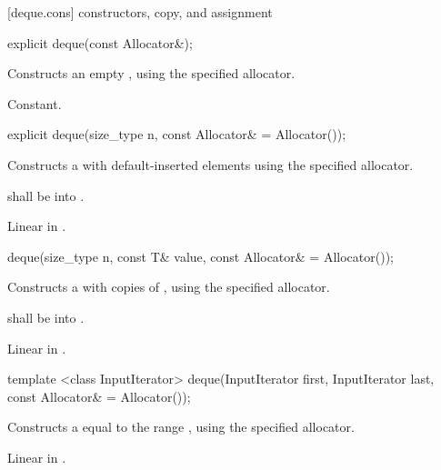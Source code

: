 [deque.cons]{ constructors, copy, and assignment}

%
\begin{itemdecl}
explicit deque(const Allocator&);
\end{itemdecl}

\begin{itemdescr}
\pnum
\effects
Constructs an empty
,
using the specified allocator.

\pnum
\complexity
Constant.
\end{itemdescr}

%
\begin{itemdecl}
explicit deque(size_type n, const Allocator& = Allocator());
\end{itemdecl}

\begin{itemdescr}
\pnum
\effects Constructs a  with
 default-inserted elements using the specified allocator.

\pnum
\requires {} shall be  into .

\pnum
\complexity Linear in .
\end{itemdescr}

%
\begin{itemdecl}
deque(size_type n, const T& value, const Allocator& = Allocator());
\end{itemdecl}

\begin{itemdescr}
\pnum
\effects
Constructs a
with  copies of ,
using the specified allocator.

\pnum
\requires {} shall be  into .

\pnum
\complexity
Linear in .
\end{itemdescr}

%
\begin{itemdecl}
template <class InputIterator>
  deque(InputIterator first, InputIterator last, const Allocator& = Allocator());
\end{itemdecl}

\begin{itemdescr}
\pnum
\effects
Constructs a
equal to the range
,
using the specified allocator.

\pnum
\complexity Linear in .
\end{itemdescr}

